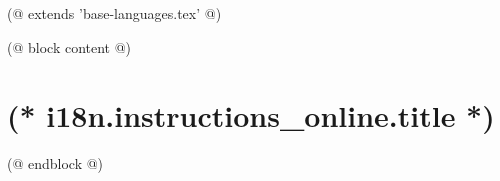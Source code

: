 (@ extends 'base-languages.tex' @)

(@ block content @)
    \pagestyle{instructions-online}
    \section{(* i18n.instructions_online.title *)}
    \ifstrequal{(* language.id *)}{persian}{\arabicfont\setRL}{}
    
    \ifstrequal{(* language.id *)}{persian}{\unsetRL}{}
(@ endblock @)
